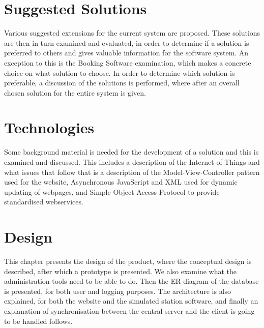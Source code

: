 	\chapter{Suggested Solutions}
	Various suggested extensions for the current system are proposed.
	These solutions are then in turn examined and evaluated, in order to determine if a solution is preferred to others and gives valuable information for the software system.
	An exception to this is the Booking Software examination, which makes a concrete choice on what solution to choose. 
	In order to determine which solution is preferable, a discussion of the solutions is performed, where after an overall chosen solution for the entire system is given.
	
	
	
	
	
	
	\chapter{Technologies}
	Some background material is needed for the development of a solution and this is examined and discussed. This includes a description of the Internet of Things and what issues that follow that is a description of the Model-View-Controller pattern used for the website, Asynchronous JavaScript and XML used for dynamic updating of webpages, and Simple Object Access Protocol to provide standardised webservices.
	
	
	
    
		
	\chapter{Design}
	This chapter presents the design of the product, where the conceptual design is described, after which a prototype is presented.
    We also examine what the administration tools need to be able to do.
	Then the ER-diagram of the database is presented, for both user and logging purposes. 
	The architecture is also explained, for both the website and the simulated station software, and finally an explanation of synchronisation between the central server and the client is going to be handled follows.
	
	
	
	
	
	
	
	
